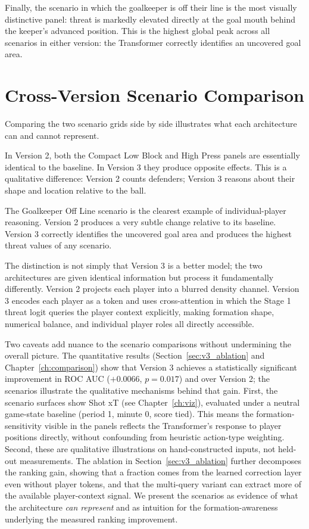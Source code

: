 Finally, the scenario in which the goalkeeper is off their line is the most visually distinctive panel: threat is markedly elevated directly at the goal mouth behind the keeper's advanced position. This is the highest global peak across all scenarios in either version: the Transformer correctly identifies an uncovered goal area.

\section{Cross-Version Scenario Comparison}

Comparing the two scenario grids side by side illustrates what each architecture can and cannot represent.

In Version 2, both the Compact Low Block and High Press panels are essentially identical to the baseline. In Version 3 they produce opposite effects. This is a qualitative difference: Version 2 counts defenders; Version 3 reasons about their shape and location relative to the ball.

The Goalkeeper Off Line scenario is the clearest example of individual-player reasoning. Version 2 produces a very subtle change relative to its baseline. Version 3 correctly identifies the uncovered goal area and produces the highest threat values of any scenario.

The distinction is not simply that Version 3 is a better model; the two architectures are given identical information but process it fundamentally differently. Version 2 projects each player into a blurred density channel. Version 3 encodes each player as a token and uses cross-attention in which the Stage 1 threat logit queries the player context explicitly, making formation shape, numerical balance, and individual player roles all directly accessible.

Two caveats add nuance to the scenario comparisons without undermining the overall picture. The quantitative results (Section~\ref{sec:v3_ablation} and Chapter~\ref{ch:comparison}) show that Version 3 achieves a statistically significant improvement in ROC AUC ($+0.0066$, $p = 0.017$) and  over Version 2; the scenarios illustrate the qualitative mechanisms behind that gain. First, the scenario surfaces show Shot xT (see Chapter~\ref{ch:viz}), evaluated under a neutral game-state baseline (period 1, minute 0, score tied). This means the formation-sensitivity visible in the panels reflects the Transformer's response to player positions directly, without confounding from heuristic action-type weighting. Second, these are qualitative illustrations on hand-constructed inputs, not held-out measurements. The ablation in Section~\ref{sec:v3_ablation} further decomposes the ranking gain, showing that a fraction comes from the learned correction layer even without player tokens, and that the multi-query variant can extract more of the available player-context signal. We present the scenarios as evidence of what the architecture \emph{can represent} and as intuition for the formation-awareness underlying the measured ranking improvement.

